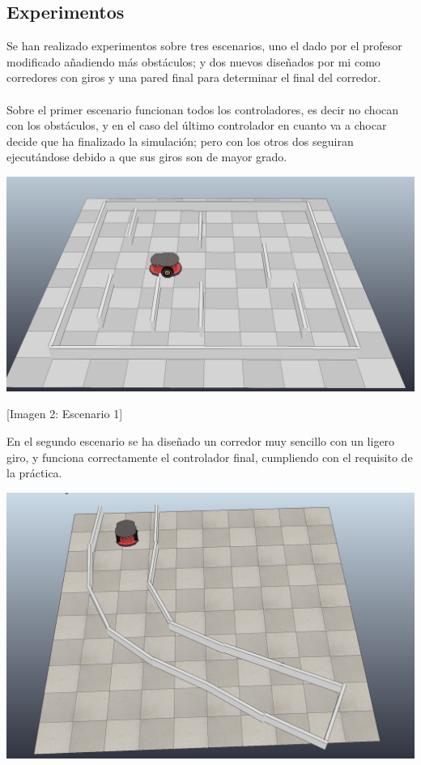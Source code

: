 \documentclass[14pt]{extarticle}
\theoremstyle{definition}
\theoremstyle{remark}
\begin{document}
\subsection{Experimentos}\label{subsec:experimentos}
Se han realizado experimentos sobre tres escenarios, uno el dado por el profesor modificado añadiendo más obstáculos; y dos nuevos diseñados por mi como corredores con giros y una pared final para determinar el final del corredor.\\\\
Sobre el primer escenario funcionan todos los controladores, es decir no chocan con los obstáculos, y en el caso del último controlador en cuanto va a chocar decide que ha finalizado la simulación; pero con los otros dos seguiran ejecutándose debido a que sus giros son de mayor grado.\\
\begin{center}
	\includegraphics[scale=0.4]{pioneer_labyrinth.png}
\end{center}
\begin{center}
	[Imagen 2: Escenario 1]
\end{center}
En el segundo escenario se ha diseñado un corredor muy sencillo con un ligero giro, y funciona correctamente el controlador final, cumpliendo con el requisito de la práctica.
\begin{center}
	\includegraphics[scale=0.4]{pioneer_corredor.png}
\end{center}
\end{document}
